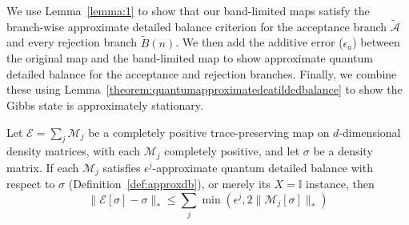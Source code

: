 We use Lemma~\ref{lemma:1} to show that our band-limited maps satisfy the branch-wise approximate detailed balance
criterion for the acceptance branch $\tilde{\mathcal{A}}$ and every rejection branch $\tilde{B}(n)$. We then add the additive error ($\epsilon_a$) between the original map and the band-limited map to show approximate quantum detailed balance for the acceptance and rejection branches. Finally, we combine these using Lemma~\ref{theorem:quantumapproximatedeatildedbalance} to show the Gibbs state is approximately stationary.
\begin{lemma}
\label{theorem:quantumapproximatedeatildedbalance}
Let $\mathcal{E} = \sum_j \mathcal{M}_j$ be a completely positive trace-preserving map on $d$-dimensional density matrices, with each $\mathcal{M}_j$ completely positive, and let $\sigma$ be a density matrix. If each $\mathcal{M}_j$ satisfies $\epsilon^j$-approximate quantum detailed balance with respect to $\sigma$ (Definition~\ref{def:approxdb}), or merely its $X=\mathbb{I}$ instance, then
\begin{equation}
     \|\mathcal{E}[\sigma]-\sigma\|_* \leq \sum_j\min\left(\epsilon^j, 2\|\mathcal{M}_j[\sigma]\|_*\right)
\end{equation}
\end{lemma}
